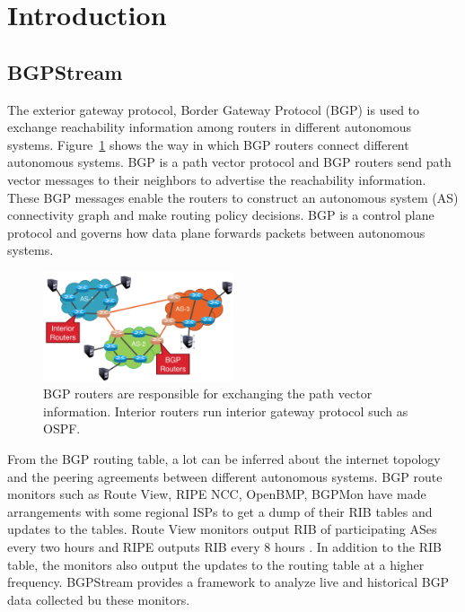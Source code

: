 \section{Introduction}\label{sec:introduction}
  \subsection{BGPStream}
 The exterior gateway protocol, Border Gateway Protocol (BGP) is used to exchange reachability information among routers in different autonomous systems. Figure~\ref{fig:bgp_router} shows the way in which BGP routers connect different autonomous systems. BGP is a path vector protocol and BGP routers send path vector messages to their neighbors to advertise the reachability information. These BGP messages enable the routers to construct an autonomous system (AS) connectivity graph and make routing policy decisions. BGP is a control plane protocol and governs how data plane forwards packets between autonomous systems. 
 \begin{figure}
	\includegraphics[width=0.5\textwidth]{Interior_and_BGP_routers.png}
	\caption{BGP routers are responsible for exchanging the path vector information. Interior routers run interior gateway protocol such as OSPF.}
	\label{fig:bgp_router}
\end{figure}
From the BGP routing table, a lot can be inferred about the internet topology and the peering agreements between different autonomous systems. BGP route monitors such as Route View, RIPE NCC, OpenBMP, BGPMon have made arrangements with some regional ISPs to get a dump of their RIB tables and updates to the tables. Route View monitors output RIB of participating ASes every two hours and RIPE outputs RIB every 8 hours \cite{orsini_bgpstream:_2016}. In addition to the RIB table, the monitors also output the updates to the routing table at a higher frequency. BGPStream provides a framework to analyze live and historical BGP data collected bu these monitors.  
